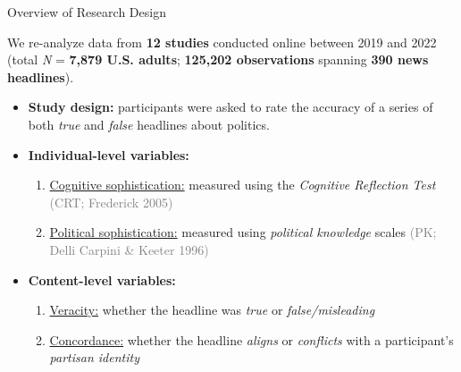 \documentclass[10pt,table]{beamer}
\begin{document}
\begin{frame}[t,fragile, label = data_overview]{Overview of Research Design}

\setlength{\leftmargini}{20pt}
\setlength{\rightmargini}{20pt}

\vspace{0.25em} \small

\begin{adjustwidth}{0.5em}{-0.25em}
We re-analyze data from \alert{\bf 12 studies} conducted online between 2019 and 2022 \\ (total \textit{N} = \alert{\bf 7,879 U.S. adults}; \alert{\bf 125,202 observations} spanning \alert{\bf 390 news headlines}). 
\end{adjustwidth} \pause \vspace{0.5em} 


\setlength{\columnsep}{-2cm}
\begin{itemize}
    \item {\bf Study design:} participants were asked to rate the accuracy of a series of \\ both \textit{true} and \textit{false} headlines about politics. \vspace{0.25em} \medskip \pause
   \item {\bf Individual-level variables:} \vspace{0.5em}
        \begin{enumerate} 
\footnotesize
            \item \ul{Cognitive sophistication:} measured using the \textit{Cognitive Reflection Test} \textcolor{gray}{(CRT; Frederick 2005)}\vspace{0.5em}
            \item \ul{Political sophistication:} measured using \textit{political knowledge }scales \textcolor{gray}{(PK; Delli Carpini \& Keeter 1996)}
        \end{enumerate} \vspace{0.5em} \pause
    \item {\bf Content-level variables:} \vspace{0.5em}
    \begin{enumerate} \footnotesize
        \item \ul{Veracity:} whether the headline was \textit{true} or \textit{false/misleading} \vspace{0.5em}
        \item \ul{Concordance:} whether the headline \textit{aligns} or \textit{conflicts} with a participant's \\ \textit{partisan identity}
    \end{enumerate}
\end{itemize}




\end{frame}
\end{document}

